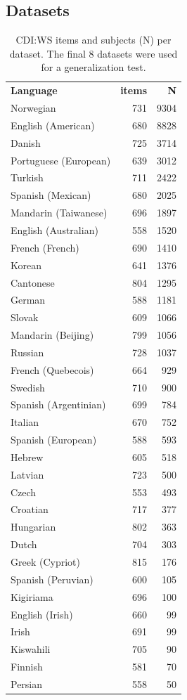 \documentclass[10pt, letterpaper]{article}
\begin{document}
\hypertarget{datasets}{%
\subsection{Datasets}\label{datasets}}

\begin{table}[H]
\centering
\begingroup\fontsize{9pt}{10pt}\selectfont
\begin{tabular}{lrr}
 {\textbf{Language}} & {\textbf{items}} & {\textbf{N}} \\ 
 Norwegian & 731 & 9304 \\ 
  English (American) & 680 & 8828 \\ 
  Danish & 725 & 3714 \\ 
  Portuguese (European) & 639 & 3012 \\ 
  Turkish & 711 & 2422 \\ 
  Spanish (Mexican) & 680 & 2025 \\ 
  Mandarin (Taiwanese) & 696 & 1897 \\ 
  English (Australian) & 558 & 1520 \\ 
  French (French) & 690 & 1410 \\ 
  Korean & 641 & 1376 \\ 
  Cantonese & 804 & 1295 \\ 
  German & 588 & 1181 \\ 
  Slovak & 609 & 1066 \\ 
  Mandarin (Beijing) & 799 & 1056 \\ 
  Russian & 728 & 1037 \\ 
  French (Quebecois) & 664 & 929 \\ 
  Swedish & 710 & 900 \\ 
  Spanish (Argentinian) & 699 & 784 \\ 
  Italian & 670 & 752 \\ 
  Spanish (European) & 588 & 593 \\ 
  Hebrew & 605 & 518 \\ 
  Latvian & 723 & 500 \\ 
  Czech & 553 & 493 \\ 
  Croatian & 717 & 377 \\ 
  Hungarian & 802 & 363 \\ 
  Dutch & 704 & 303 \\ 
   \hline
Greek (Cypriot) & 815 & 176 \\ 
  Spanish (Peruvian) & 600 & 105 \\ 
  Kigiriama & 696 & 100 \\ 
  English (Irish) & 660 & 99 \\ 
  Irish & 691 & 99 \\ 
  Kiswahili & 705 & 90 \\ 
  Finnish & 581 & 70 \\ 
  Persian & 558 & 50 \\ 
  \end{tabular}
\endgroup
\caption{CDI:WS items and subjects (N) per dataset. The final 8 datasets were used for a generalization test.} 
\end{table}
\end{document}
